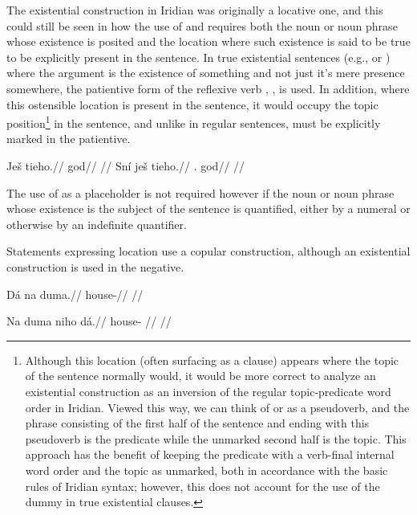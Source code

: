 The existential construction in Iridian was originally a locative one, and this could still be seen in how the use of  and  requires both the noun or noun phrase whose existence is posited and the location where such existence is said to be true to be explicitly present in the sentence. In true existential sentences (e.g.,  or ) where the argument is the existence of something and not just it's mere presence somewhere, the patientive form of the reflexive verb , , is used. In addition, where this ostensible location is present in the sentence, it would occupy the topic position\footnote{Although this location (often surfacing as a  clause) appears where the topic of the sentence normally would, it would be more correct to analyze an existential construction as an inversion of the regular topic-predicate word order in Iridian. Viewed this way, we can think of  or  as a pseudoverb, and the phrase consisting of the first half of the sentence and ending with this pseudoverb is the predicate while the unmarked second half is the topic. This approach has the benefit of keeping the predicate with a verb-final internal word order and the topic as unmarked, both in accordance with the basic rules of Iridian syntax; however, this does not account for the use of the dummy  in true existential clauses.} in the sentence, and unlike in regular sentences, must be explicitly marked in the patientive.


\begin{multicols}{2}
\pex
\a\begingl
\gla \ljudge{*}Ješ tieho.//
\glb \Exst{} god//
\glft {}//
\endgl
\a\begingl
\gla Sní ješ tieho.//
\glb \Refl{}.\Acc{} \Exst{} god//
\glft {}//
\endgl
\xe
\end{multicols}

The use of  as a placeholder is not required however if the noun or noun phrase whose existence is the subject of the sentence is quantified, either by a numeral or otherwise by an indefinite quantifier.

Statements expressing location use a copular construction, although an existential construction is used in the negative.

\pex
\begingl
\gla Dá na duma.//
\glb {} \Loc{} house-\Acc{}//
\glft {}//
\endgl
\xe

\pex
\begingl
\gla Na duma niho dá.//
\glb \Loc{} house-\Acc{} \N{}\Exst{} //
\glft {}//
\endgl
\xe

